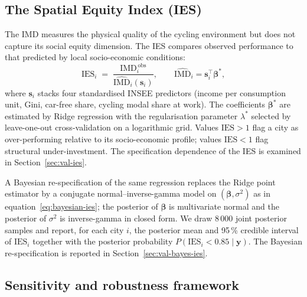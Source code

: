 \documentclass[11pt,a4paper]{article}
\newcommand{\IMD}{\mathrm{IMD}}
\newcommand{\IES}{\mathrm{IES}}
\begin{document}
\subsection{The Spatial Equity Index (IES)}

The IMD measures the physical quality of the cycling environment
but does not capture its social equity dimension. The IES compares
observed performance to that predicted by local socio-economic
conditions:
\begin{equation}
    \IES_i \;=\;
    \frac{\IMD_i^{\,\text{obs}}}
         {\widehat{\IMD}_i(\mathbf{s}_i)},
    \qquad
    \widehat{\IMD}_i = \mathbf{s}_i^{\top}\boldsymbol{\beta}^{\ast},
    \label{eq:ies}
\end{equation}
where $\mathbf{s}_i$ stacks four standardised INSEE predictors
(income per consumption unit, Gini, car-free share, cycling
modal share at work). The coefficients $\boldsymbol{\beta}^{\ast}$
are estimated by Ridge regression with the regularisation
parameter $\lambda^{\ast}$ selected by leave-one-out
cross-validation on a logarithmic grid. Values $\IES > 1$ flag a
city as over-performing relative to its socio-economic profile;
values $\IES < 1$ flag structural under-investment. The
specification dependence of the IES is examined in
Section~\ref{sec:val-ies}.

A Bayesian re-specification of the same regression replaces the
Ridge point estimator by a conjugate normal--inverse-gamma model
on $(\boldsymbol{\beta}, \sigma^{2})$ as in
equation~\eqref{eq:bayesian-ies}; the posterior of
$\boldsymbol{\beta}$ is multivariate normal and the posterior of
$\sigma^{2}$ is inverse-gamma in closed form. We draw $8\,000$
joint posterior samples and report, for each city $i$, the
posterior mean and 95\,\% credible interval of $\IES_i$ together
with the posterior probability $P(\IES_i < 0.85 \mid
\mathbf{y})$. The Bayesian re-specification is reported in
Section~\ref{sec:val-bayes-ies}.

\subsection{Sensitivity and robustness framework}
\end{document}
